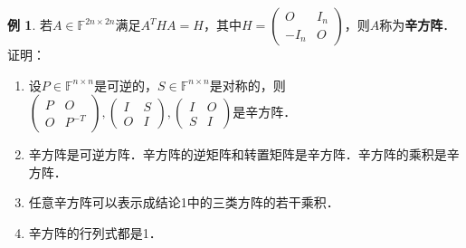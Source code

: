 \documentclass[a4paper,fontset=windows]{ctexbook}
\theoremstyle{definition}
\newtheorem{example}{例}[chapter]
\begin{document}
\begin{example}\label{ex4.12}
若$A\in\mathbb{F}^{2n\times 2n}$满足$A^THA=H$，其中$H=\begin{pmatrix}O&I_n \\ -I_n&O\end{pmatrix}$，则$A$称为{\bf 辛方阵}．证明：
\begin{enumerate}
\item 设$P\in\mathbb{F}^{n\times n}$是可逆的，$S\in\mathbb{F}^{n\times n}$是对称的，则$\begin{pmatrix}P&O \\ O&P^{-T}\end{pmatrix},\begin{pmatrix}I&S \\ O&I\end{pmatrix},\begin{pmatrix}I&O \\ S&I\end{pmatrix}$是辛方阵．

\item 辛方阵是可逆方阵．辛方阵的逆矩阵和转置矩阵是辛方阵．辛方阵的乘积是辛方阵．

\item 任意辛方阵可以表示成结论1中的三类方阵的若干乘积．

\item 辛方阵的行列式都是1．
\end{enumerate}
\end{example}
\end{document}
